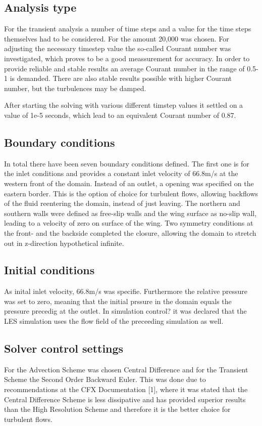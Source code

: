 \subsection{Analysis type}
For the transient analysis a number of time steps and a value for the time steps themselves had to be considered. For the amount 20,000 was chosen. For adjusting the necessary timestep value the so-called Courant number was investigated, which proves to be a good meassurement for accuracy. In order to provide reliable and stable results an average Courant number in the range of 0.5-1 is demanded. There are also stable results possible with higher Courant number, but the turbulences may be damped.

After starting the solving with various different timstep values it settled on a value of 1e-5 seconds, which lead to an equivalent Courant number of 0.87.
\subsection{Boundary conditions}
In total there have been seven boundary conditions defined. The first one is for the inlet conditions and provides a constant inlet velocity of 66.8m/s at the western front of the domain. Instead of an outlet, a opening was specified on the eastern border. This is the option of choice for turbulent flows, allowing backflows of the fluid reentering the domain, instead of just leaving. The northern and southern walls were defined as free-slip walls and the wing surface as no-slip wall, leading to a velocity of zero on surface of the wing. Two symmetry conditions at the front- and the backside completed the closure, allowing the domain to stretch out in z-direction hypothetical infinite.
\subsection{Initial conditions}
As inital inlet velocity, 66.8m/s was specifie. Furthermore the relative pressure was set to zero, meaning that the initial prssure in the domain equals the pressure precedig at the outlet.
In simulation control? it was declared that the LES simulation uses the flow field of the preceeding simulation as well.
\subsection{Solver control settings}
For the Advection Scheme was chosen Central Difference and for the Transient Scheme the Second Order Backward Euler. This was done due to recommendations at the CFX Documentation [1], where it was stated that the Central Difference Scheme is less dissipative and has provided superior results than the High Resolution Scheme and therefore it is the better choice for turbulent flows.

